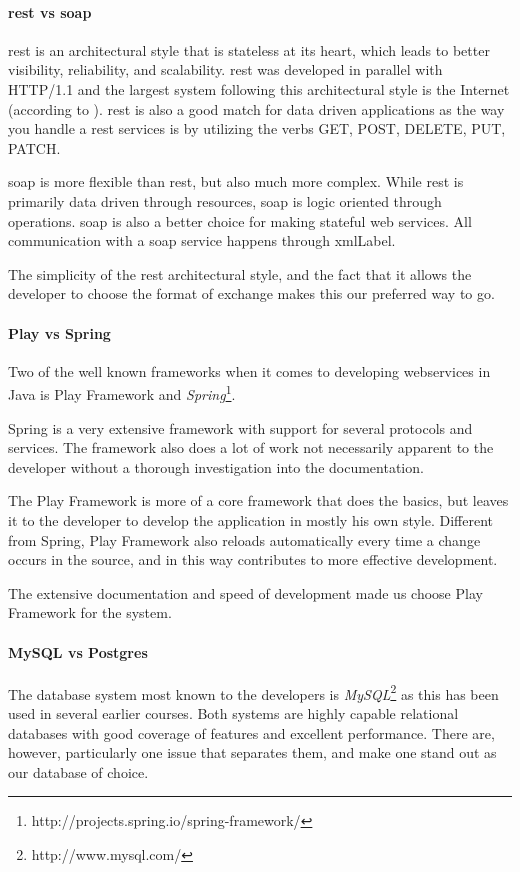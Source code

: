 \documentclass[11pt]{book}
\begin{document}
\paragraph{\gls{rest} vs \gls{soap}}
\gls{rest} \cite{rest} is an architectural style that is stateless at its heart, which leads to better visibility, reliability, and scalability. \gls{rest} was developed in parallel with HTTP/1.1 and the largest system following this architectural style is the Internet (according to \cite{wikipedia:rest}). \gls{rest} is also a good match for data driven applications as the way you handle a \gls{rest} services is by utilizing the verbs GET, POST, DELETE, PUT, PATCH.

\gls{soap} is more flexible than \gls{rest}, but also much more complex. While \gls{rest} is primarily data driven through resources, \gls{soap} is logic oriented through operations. \gls{soap} is also a better choice for making stateful web services. All communication with a \gls{soap} service happens through \gls{xmlLabel}.

The simplicity of the \gls{rest} architectural style, and the fact that it allows the developer to choose the format of exchange makes this our preferred way to go.

\paragraph{Play vs Spring}
Two of the well known frameworks when it comes to developing webservices in Java is Play Framework and \emph{Spring}\footnote{http://projects.spring.io/spring-framework/}.

Spring is a very extensive framework with support for several protocols and services. The framework also does a lot of work not necessarily apparent to the developer without a thorough investigation into the documentation.

The Play Framework is more of a core framework that does the basics, but leaves it to the developer to develop the application in mostly his own style. Different from Spring, Play Framework also reloads automatically every time a change occurs in the source, and in this way contributes to more effective development.

The extensive documentation and speed of development made us choose Play Framework for the system.

\paragraph{MySQL vs Postgres}
The database system most known to the developers is \emph{MySQL}\footnote{http://www.mysql.com/} as this has been used in several earlier courses. Both systems are highly capable relational databases with good coverage of features and excellent performance. There are, however, particularly one issue that separates them, and make one stand out as our database of choice.
\end{document}
